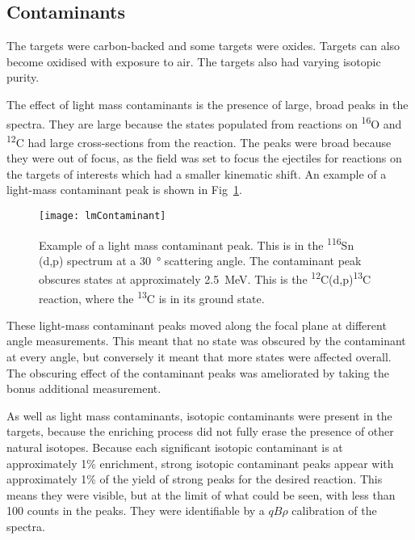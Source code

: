 \subsection{Contaminants}

The targets were carbon-backed and some targets were oxides. Targets can also become oxidised with exposure to air. The targets also had varying isotopic purity.

The effect of light mass contaminants is the presence of large, broad peaks in the spectra. They are large because the states populated from reactions on \textsuperscript{16}O and \textsuperscript{12}C had large cross-sections from the reaction. The peaks were broad because they were out of focus, as the field was set to focus the ejectiles for reactions on the targets of interests which had a smaller kinematic shift. An example of a light-mass contaminant peak is shown in Fig~\ref{lmContaminant}.

\begin{figure}[h]	
\hspace*{-0.5cm}
\begin{center}
	\texttt{[image: lmContaminant]}
\end{center}
			\caption[Example of a light mass contaminant peak]{Example of a light mass contaminant peak. This is in the \textsuperscript{116}Sn (d,p) spectrum at a \SI{30}{\degree} scattering angle. The contaminant peak obscures states at approximately \SI{2.5}{\mega\electronvolt}. This is the \textsuperscript{12}C(d,p)\textsuperscript{13}C reaction, where the \textsuperscript{13}C is in its ground state.}
		\label{lmContaminant}
\end{figure}
\FloatBarrier

These light-mass contaminant peaks moved along the focal plane at different angle measurements. This meant that no state was obscured by the contaminant at every angle, but conversely it meant that more states were affected overall. The obscuring effect of the contaminant peaks was ameliorated by taking the bonus additional measurement.

As well as light mass contaminants, isotopic contaminants were present in the targets, because the enriching process did not fully erase the presence of other natural isotopes. Because each significant isotopic contaminant is at approximately 1\% enrichment, strong isotopic contaminant peaks appear with approximately 1\% of the yield of strong peaks for the desired reaction. This means they were visible, but at the limit of what could be seen, with less than 100 counts in the peaks. They were identifiable by a $qB\rho$ calibration of the spectra.

